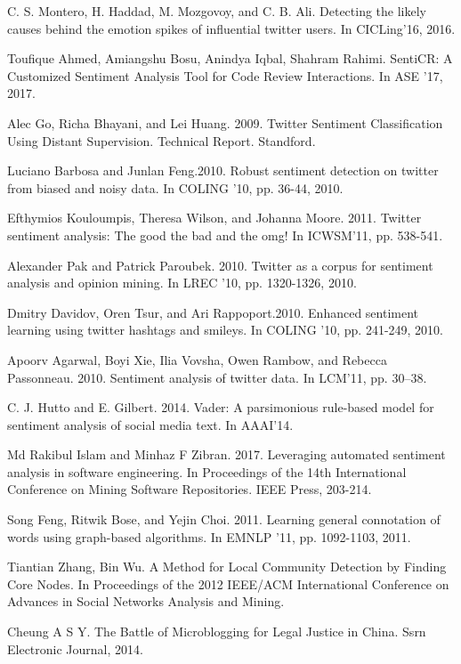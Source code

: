 \documentclass[runningheads]{llncs}
\begin{document}
\begin{thebibliography}{8}
C. S. Montero, H. Haddad, M. Mozgovoy, and C. B. Ali.
\newblock Detecting the likely causes behind the emotion spikes of influential twitter users. 
\newblock In CICLing’16, 2016.

Toufique Ahmed, Amiangshu Bosu, Anindya Iqbal, Shahram Rahimi.
\newblock SentiCR: A Customized Sentiment Analysis Tool for Code Review Interactions.
\newblock In ASE ’17, 2017.

Alec Go, Richa Bhayani, and Lei Huang. 2009.
\newblock Twitter Sentiment Classification Using Distant Supervision.
\newblock Technical Report. Standford.

Luciano Barbosa and Junlan Feng.2010.
\newblock Robust sentiment detection on twitter from biased and noisy data.
\newblock In COLING ’10, pp. 36-44, 2010.

Efthymios Kouloumpis, Theresa Wilson, and Johanna Moore. 2011.
\newblock Twitter sentiment analysis: The good the bad and the omg!
\newblock In ICWSM’11, pp. 538-541.

Alexander Pak and Patrick Paroubek. 2010.
\newblock Twitter as a corpus for sentiment analysis and opinion mining.
\newblock In LREC ’10, pp. 1320-1326, 2010.

Dmitry Davidov, Oren Tsur, and Ari Rappoport.2010.
\newblock Enhanced sentiment learning using twitter hashtags and smileys.
\newblock In COLING ’10, pp. 241-249, 2010.

Apoorv Agarwal, Boyi Xie, Ilia Vovsha, Owen Rambow, and Rebecca Passonneau. 2010.
\newblock Sentiment analysis of twitter data.
\newblock In LCM’11, pp. 30–38.

C. J. Hutto and E. Gilbert. 2014.
\newblock Vader: A parsimonious rule-based model for sentiment analysis of social media text.
\newblock In AAAI’14.

Md Rakibul Islam and Minhaz F Zibran. 2017.
\newblock Leveraging automated sentiment analysis in software engineering. 
\newblock In Proceedings of the 14th International Conference on Mining Software Repositories. IEEE Press, 203-214.

Song Feng, Ritwik Bose, and Yejin Choi. 2011.
\newblock Learning general connotation of words using graph-based algorithms.
\newblock In EMNLP ’11, pp. 1092-1103, 2011.

Tiantian Zhang, Bin Wu.
\newblock A Method for Local Community Detection by Finding Core Nodes. 
\newblock In Proceedings of the 2012 IEEE/ACM International Conference on Advances in Social Networks Analysis and Mining.

Cheung A S Y. 
\newblock The Battle of Microblogging for Legal Justice in China. 
\newblock Ssrn Electronic Journal, 2014.


\end{thebibliography}
\end{document}
